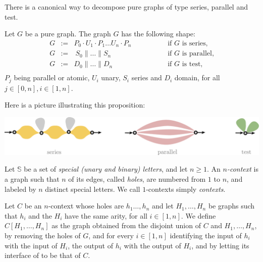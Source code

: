    There is a canonical way to decompose pure graphs of type series, parallel and test. 
 \begin{proposition}
 Let $G$ be a pure graph. The graph $G$ has the following shape:
 $$\begin{array}{llll}
 G&:=&  P_0\cdot U_1 \cdot P_1 \dots U_n\cdot P_n & \qquad \qquad\text{ if $G$ is series,}\\[3pt]
 G&:=&  \ S_0\parallel  \dots \parallel S_n &  \qquad \qquad\text{ if $G$ is parallel,}\\[3pt]
 G&:=&  D_0\parallel  \dots \parallel D_n &  \qquad \qquad\text{ if $G$ is test,}\\
 \end{array}$$
 $P_j$ being parallel or atomic, $U_i$ unary, $S_i$ series and $D_i$ domain, for all $j\in[0,n], i\in[1,n]$.
\end{proposition}
Here is a picture illustrating this proposition:
\begin{center}
\includegraphics[scale=.35]{Pictures/spt}
\end{center}
\begin{definition}[Contexts]
Let $\mathbb{S}$ be a set of \emph{special (unary and binary) letters}, and let $n\geq 1$. An \emph{$n$-context}  is a graph such that $n$ of its edges, called \emph{holes}, are numbered from $1$ to $n$, and labeled by $n$ distinct special letters.  We call $1$-contexts simply \emph{contexts}.

Let $C$ be an $n$-context whose holes are $h_1\dots,h_n$ and let $H_1,\dots,H_n$ be graphs such that $h_i$ and the $H_i$ have the same arity, for all $i\in [1, n]$.  We define $C[H_1,\dots,H_n]$ as the graph obtained from the disjoint union of $C$ and $H_1,\dots, H_n$, by removing the holes of $G$, and for every $i\in[1,n]$  identifying the input of $h_i$ with the input of $H_i$, the output of $h_i$ with the output of $H_i$, and  by letting its interface of  to be that of $C$.
\end{definition}

